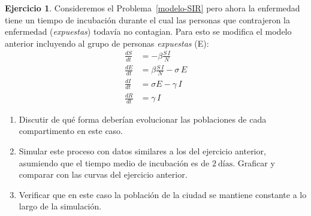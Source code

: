 \documentclass[12pt, a4paper]{amsbook}
\theoremstyle{remark}
\theoremstyle{definition}
\newtheorem{ejer}[teo]{Ejercicio}
\numberwithin{section}{chapter}
\numberwithin{subsection}{section}
\numberwithin{equation}{section}
\numberwithin{figure}{chapter}
\begin{document}
\begin{ejer}\label{modelo-SEIR}
Consideremos el Problema~\ref{modelo-SIR} pero ahora la enfermedad tiene un tiempo de incubación durante el cual las personas que contrajeron la enfermedad (\textit{expuestas}) todavía no contagian. Para esto se modifica el modelo anterior incluyendo al grupo de personas \textit{expuestas} (E):
\begin{align*}
    \frac{dS}{dt} &= -\beta \frac{S\,I}{N}\\
    \frac{dE}{dt} &= \beta \frac{S\,I}{N} -\sigma \, E\\
    \frac{dI}{dt} &= \sigma E -\gamma\, I\\
    \frac{dR}{dt} &= \gamma\, I
\end{align*}
\begin{enumerate}
    \item Discutir de qué forma deberían evolucionar las poblaciones de cada compartimento en este caso. 
    \item Simular este proceso con datos similares a los del ejercicio anterior, asumiendo que el tiempo medio de incubación es de $2~\text{días}$. Graficar y comparar con las curvas del ejercicio anterior.
    \item Verificar que en este caso la población de la ciudad se mantiene constante a lo largo de la simulación.
\end{enumerate}
\end{ejer}
\end{document}
